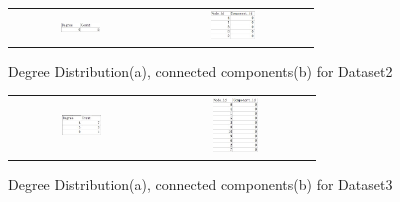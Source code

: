 \begin{figure}[H]
\begin{center}
\begin{tabular}{cc}
     \includegraphics[width=0.3\textwidth]{FIG/2dd.jpg} &
     \includegraphics[width=0.3\textwidth]{FIG/2cc.jpg} \\
\end{tabular}
\caption{Degree Distribution(a), connected components(b) for Dataset2}
\end{center}
\end{figure}


\begin{figure}[H]
\begin{center}
\begin{tabular}{cc}
     \includegraphics[width=0.3\textwidth]{FIG/3dd.jpg} &
     \includegraphics[width=0.3\textwidth]{FIG/3cc.jpg} \\
\end{tabular}
\caption{Degree Distribution(a), connected components(b) for Dataset3}
\end{center}
\end{figure}

